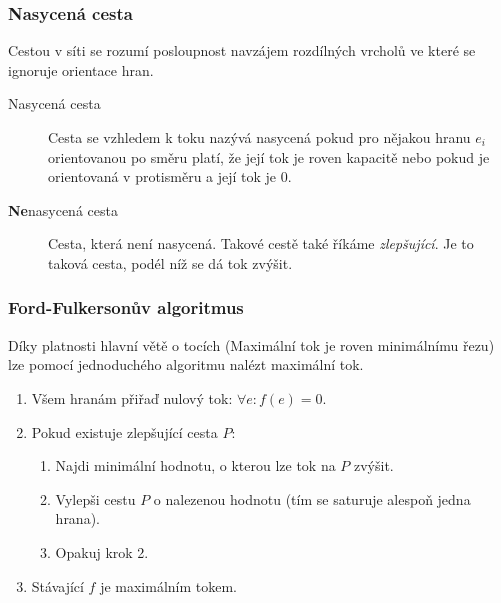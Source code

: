 \subsubsection{Nasycená cesta}

Cestou v síti se rozumí posloupnost navzájem rozdílných vrcholů ve které se ignoruje orientace hran.

\begin{description}
    \item[Nasycená cesta] Cesta se vzhledem k toku nazývá nasycená pokud pro nějakou hranu $e_i$ orientovanou po směru platí, že její tok je roven kapacitě nebo pokud je orientovaná v protisměru a její tok je $0$.
    \item[\textbf{Ne}nasycená cesta] Cesta, která není nasycená.
    Takové cestě také říkáme \textit{zlepšující}.
    Je to taková cesta, podél níž se dá tok zvýšit.
\end{description}


\subsubsection{Ford-Fulkersonův algoritmus}

Díky platnosti hlavní větě o tocích (Maximální tok je roven minimálnímu řezu) lze pomocí jednoduchého algoritmu nalézt maximální tok.

\begin{enumerate}
    \item Všem hranám přiřaď nulový tok: $\forall e: f(e) = 0$.
    \item Pokud existuje zlepšující cesta $P$:
    \begin{enumerate}
        \item Najdi minimální hodnotu, o kterou lze tok na $P$ zvýšit.
        \item Vylepši cestu $P$ o nalezenou hodnotu (tím se saturuje alespoň jedna hrana).
        \item Opakuj krok 2.
    \end{enumerate}
    \item Stávající $f$ je maximálním tokem.
\end{enumerate}
